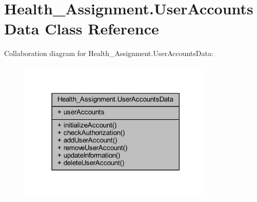 \hypertarget{class_health___assignment_1_1_user_accounts_data}{}\section{Health\+\_\+\+Assignment.\+User\+Accounts\+Data Class Reference}
\label{class_health___assignment_1_1_user_accounts_data}


Collaboration diagram for Health\+\_\+\+Assignment.\+User\+Accounts\+Data\+:\nopagebreak
\begin{figure}[H]
\begin{center}
\leavevmode
\includegraphics[width=266pt]{class_health___assignment_1_1_user_accounts_data__coll__graph}
\end{center}
\end{figure}
